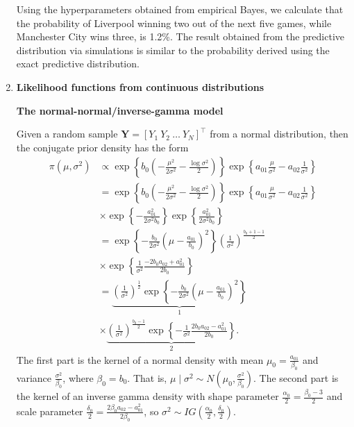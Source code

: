 \begin{enumerate}
Using the hyperparameters obtained from empirical Bayes, we calculate that the probability of Liverpool winning two out of the next five games, while Manchester City wins three, is 1.2\%. The result obtained from the predictive distribution via simulations is similar to the probability derived using the exact predictive distribution.

\item \textbf{Likelihood functions from continuous distributions}

\textbf{The normal-normal/inverse-gamma model}

Given a random sample $\bm{Y}=[Y_1 \ Y_2 \ \dots \ Y_N]^{\top}$ from a normal distribution, then the conjugate prior density has the form 
\begin{align}
	\pi(\mu,\sigma^2)&\propto \exp\left\{b_0\left(-\frac{\mu^2}{2\sigma^2}-\frac{\log \sigma^2}{2}\right)\right\}\exp\left\{a_{01}\frac{\mu}{\sigma^2}-a_{02}\frac{1}{\sigma^2}\right\}\nonumber\\
	&=\exp\left\{b_0\left(-\frac{\mu^2}{2\sigma^2}-\frac{\log \sigma^2}{2}\right)\right\}\exp\left\{a_{01}\frac{\mu}{\sigma^2}-a_{02}\frac{1}{\sigma^2}\right\}\nonumber\\
	&\times \exp\left\{-\frac{a_{01}^2}{2\sigma^2b_0}\right\}\exp\left\{\frac{a_{01}^2}{2\sigma^2b_0}\right\}\nonumber\\
	&=\exp\left\{-\frac{b_0}{2\sigma^2}\left(\mu-\frac{a_{01}}{b_0}\right)^2\right\}\left(\frac{1}{\sigma^2}\right)^{\frac{b_0+1-1}{2}}\nonumber\\
	&\times \exp\left\{\frac{1}{\sigma^2}\frac{-2b_0a_{02}+a_{01}^2}{2b_0}\right\}\nonumber\\
	&=\underbrace{\left(\frac{1}{\sigma^2}\right)^{\frac{1}{2}}\exp\left\{-\frac{b_0}{2\sigma^2}\left(\mu-\frac{a_{01}}{b_0}\right)^2\right\}}_{1}\nonumber\\
	&\times\underbrace{\left(\frac{1}{\sigma^2}\right)^{\frac{b_0-1}{2}}\exp\left\{-\frac{1}{\sigma^2}\frac{2b_0a_{02}-a_{01}^2}{2b_0}\right\}}_{2}.\nonumber
\end{align}
The first part is the kernel of a normal density with mean \( \mu_0 = \frac{a_{01}}{\beta_0} \) and variance \( \frac{\sigma^2}{\beta_0} \), where \( \beta_0 = b_0 \). That is, \( \mu \mid \sigma^2 \sim N\left(\mu_0, \frac{\sigma^2}{\beta_0}\right) \). The second part is the kernel of an inverse gamma density with shape parameter \( \frac{\alpha_0}{2} = \frac{\beta_0 - 3}{2} \) and scale parameter \( \frac{\delta_0}{2} = \frac{2\beta_0 a_{02} - a_{01}^2}{2\beta_0} \), so \( \sigma^2 \sim IG\left(\frac{\alpha_0}{2}, \frac{\delta_0}{2}\right) \).


\end{enumerate}
